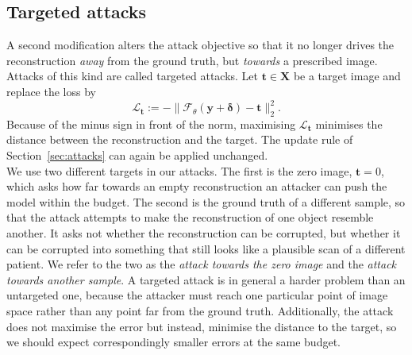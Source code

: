 \documentclass{article}
\numberwithin{equation}{section}
\begin{document}
\subsection{Targeted attacks}\label{sec:targeted}
A second modification alters the attack objective so that it no longer drives the reconstruction \emph{away} from the ground truth,
but \emph{towards} a prescribed image. Attacks of this kind are called targeted attacks.
Let $\mathbf{t}\in\mathbf{X}$ be a target image and replace the loss by
\[\mathcal{L}_\mathbf{t}:=-\lVert\mathcal{F}_\theta(\mathbf{y}+\boldsymbol{\delta})-\mathbf{t}\rVert_2^2 .\]
Because of the minus sign in front of the norm, maximising $\mathcal{L}_\mathbf{t}$ minimises the distance between the reconstruction and the target.
The update rule of Section~\ref{sec:attacks} can again be applied unchanged.\\
We use two different targets in our attacks. The first is the zero image, $\mathbf{t}=0$, which asks how
far towards an empty reconstruction an attacker can push the model within the budget. The
second is the ground truth of a different sample, so that the attack attempts to
make the reconstruction of one object resemble another. It asks not whether the reconstruction can be corrupted, but
whether it can be corrupted into something that still looks like a plausible scan of a
different patient. We refer to the two as the \emph{attack towards the zero image} and the
\emph{attack towards another sample}. A targeted attack is in general a harder problem than an untargeted one,
because the attacker must reach one particular point of image space rather than any point
far from the ground truth. Additionally, the attack does not maximise the error but instead, minimise the distance to the target,
so we should expect correspondingly smaller errors at the same budget.
\end{document}
